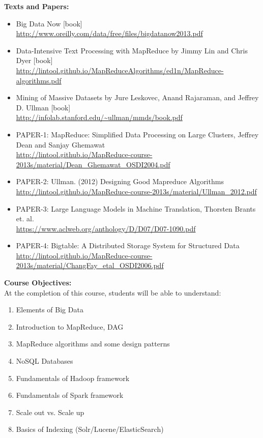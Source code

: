 \documentclass[11pt]{article}
\begin{document}
\textbf {\large Texts and Papers:} 
\begin{itemize}
\item   Big Data Now [book] \\
        \url{http://www.oreilly.com/data/free/files/bigdatanow2013.pdf}

\item   Data-Intensive Text Processing with MapReduce by Jimmy Lin and Chris Dyer [book] \\
        \url{http://lintool.github.io/MapReduceAlgorithms/ed1n/MapReduce-algorithms.pdf}

\item   Mining of Massive Datasets by Jure Leskovec, Anand Rajaraman, and Jeffrey D. Ullman [book] \\
        \url{http://infolab.stanford.edu/~ullman/mmds/book.pdf}

\item \label{PAPER-1} PAPER-1: MapReduce: Simplified Data Processing on Large Clusters, Jeffrey Dean and Sanjay Ghemawat \\
          \url{http://lintool.github.io/MapReduce-course-2013s/material/Dean_Ghemawat_OSDI2004.pdf}

\item \label{PAPER-2} PAPER-2: Ullman. (2012) Designing Good Mapreduce Algorithms \\
         \url{http://lintool.github.io/MapReduce-course-2013s/material/Ullman_2012.pdf}
         
\item \label{PAPER-3} PAPER-3: Large Language Models in Machine Translation, Thorsten Brants et. al. \\
         \url{https://www.aclweb.org/anthology/D/D07/D07-1090.pdf}
         
\item \label{PAPER-4} PAPER-4: Bigtable: A Distributed Storage System for Structured Data \\
         \url{http://lintool.github.io/MapReduce-course-2013s/material/ChangFay_etal_OSDI2006.pdf}
\end{itemize}         


\textbf {\large Course Objectives:} \\
At the completion of this course, students will be able to understand:
\begin{enumerate} \itemsep-0.4em
  \item Elements of Big Data
  \item Introduction to MapReduce, DAG
  \item MapReduce algorithms and some design patterns
  \item NoSQL Databases
  \item Fundamentals of Hadoop framework
  \item Fundamentals of Spark framework
  \item Scale out vs. Scale up
  \item Basics of Indexing (Solr/Lucene/ElasticSearch)
\end{enumerate}
\end{document}
